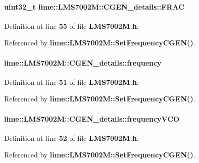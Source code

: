 \paragraph[{F\+R\+AC}]{\setlength{\rightskip}{0pt plus 5cm}uint32\+\_\+t lime\+::\+L\+M\+S7002\+M\+::\+C\+G\+E\+N\+\_\+details\+::\+F\+R\+AC}\label{structlime_1_1LMS7002M_1_1CGEN__details_ac15d8d9eb07f283b3e5e4fbf7c639c36}


Definition at line {\bf 55} of file {\bf L\+M\+S7002\+M.\+h}.



Referenced by {\bf lime\+::\+L\+M\+S7002\+M\+::\+Set\+Frequency\+C\+G\+E\+N()}.

\paragraph[{frequency}]{ lime\+::\+L\+M\+S7002\+M\+::\+C\+G\+E\+N\+\_\+details\+::frequency}\label{structlime_1_1LMS7002M_1_1CGEN__details_a1429b9a509b57e783528d810250e9ed6}


Definition at line {\bf 51} of file {\bf L\+M\+S7002\+M.\+h}.



Referenced by {\bf lime\+::\+L\+M\+S7002\+M\+::\+Set\+Frequency\+C\+G\+E\+N()}.

\paragraph[{frequency\+V\+CO}]{ lime\+::\+L\+M\+S7002\+M\+::\+C\+G\+E\+N\+\_\+details\+::frequency\+V\+CO}\label{structlime_1_1LMS7002M_1_1CGEN__details_a90aba2d36e5cad3816116cf0c19206e0}


Definition at line {\bf 52} of file {\bf L\+M\+S7002\+M.\+h}.



Referenced by {\bf lime\+::\+L\+M\+S7002\+M\+::\+Set\+Frequency\+C\+G\+E\+N()}.

